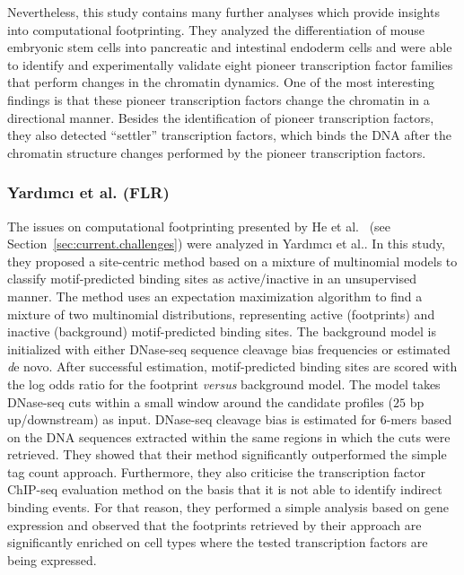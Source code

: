 Nevertheless, this study contains many further analyses which provide insights into computational footprinting. They analyzed the differentiation of mouse embryonic stem cells into pancreatic and intestinal endoderm cells and were able to identify and experimentally validate eight pioneer transcription factor families that perform changes in the chromatin dynamics. One of the most interesting findings is that these pioneer transcription factors change the chromatin in a directional manner. Besides the identification of pioneer transcription factors, they also detected ``settler'' transcription factors, which binds the DNA after the chromatin structure changes performed by the pioneer transcription factors.

\subsubsection{Yard{\i}mc{\i} et al. (FLR)}
\label{sec:yardimci.2}

The issues on computational footprinting presented by He et al.~\cite{he2014} (see Section~\ref{sec:current.challenges}) were analyzed in Yard{\i}mc{\i} et al.\cite{yardimci2014}. In this study, they proposed a site-centric method based on a mixture of multinomial models to classify motif-predicted binding sites as active/inactive in an unsupervised manner. The method uses an expectation maximization algorithm to find a mixture of two multinomial distributions, representing active (footprints) and inactive (background) motif-predicted binding sites. The background model is initialized with either DNase-seq sequence cleavage bias frequencies or estimated {\emph de novo}. After successful estimation, motif-predicted binding sites are scored with the log odds ratio for the footprint \emph{versus} background model. The model takes DNase-seq cuts within a small window around the candidate profiles ($25$ bp up/downstream) as input. DNase-seq cleavage bias is estimated for $6$-mers based on the DNA sequences extracted within the same regions in which the cuts were retrieved. They showed that their method significantly outperformed the simple tag count approach. Furthermore, they also criticise the transcription factor ChIP-seq evaluation method on the basis that it is not able to identify indirect binding events. For that reason, they performed a simple analysis based on gene expression and observed that the footprints retrieved by their approach are significantly enriched on cell types where the tested transcription factors are being expressed.

